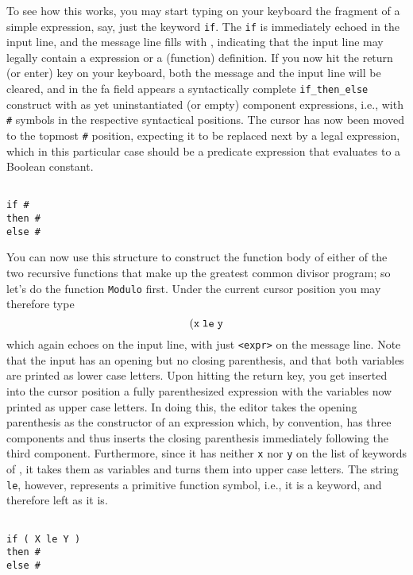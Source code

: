 To see how this works, you may start typing
on your {\mys keyboard} the fragment of a simple \kir expression, say, just the
keyword {\tt if}. The {\tt if} is immediately echoed in the input line, and
the message line fills with {\tt <expr|def>}, indicating that the input
line may legally contain a \kir expression or a (function) definition.
If you now hit the return (or enter) key on your keyboard, both the message and the input
line will be cleared, and in the {\sc fa} field appears a syntactically complete
{\tt if\_then\_else} construct with as yet uninstantiated (or empty)
component expressions,
i.e., with {\tt \#} symbols in the respective syntactical positions. The cursor
has now been moved to the topmost {\tt \#} position, expecting it to be
replaced next by a legal \kir expression, which in this particular case should
be a predicate expression that evaluates to a Boolean constant.
\begin{verbatim}

if #
then #
else #

\end{verbatim}
You can now use this structure to construct the function body of either of
the two recursive functions that make up the greatest common divisor
program; so let's do the function {\tt Modulo} first. Under the current cursor
position you may therefore type
$$
{\tt ( x \; le \; y }
$$
which again echoes
on the input line, with just {\tt <expr>} on the message line. Note that the
input has an opening but no closing parenthesis, and that both
variables are printed as lower case letters. Upon hitting the return key,
you get inserted into the cursor position a fully parenthesized expression
with the variables now printed as upper case letters.
In doing this, the editor takes the opening parenthesis
as the constructor of an expression which, by convention, has three
components and thus inserts the closing parenthesis immediately following
the third component. Furthermore, since it has neither {\tt x} nor {\tt y}
on the list of keywords of \kir, it takes them as variables and turns them
into upper case letters. The string {\tt le}, however, represents 
a primitive function symbol, i.e., it is a keyword, and therefore left as it is. 
\begin{verbatim}

if ( X le Y )
then #
else #

\end{verbatim}
